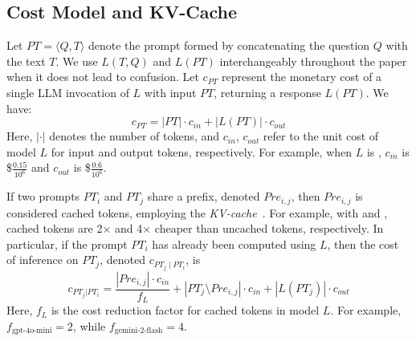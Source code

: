 \subsection{Cost Model and KV-Cache} 
\label{subsec:cost-model}
Let $PT = \langle Q, T \rangle$ denote the prompt formed by concatenating the question $Q$ with the text $T$. We use $L(T, Q)$ and $L(PT)$ interchangeably throughout the paper when it does not lead to confusion. Let $c_{PT}$ represent the monetary cost of a single LLM invocation of $L$ with input $PT$, returning a response $L(PT)$. We have:
\begin{equation}
    c_{PT} = |PT|\cdot c_{in} + |L(PT)|\cdot c_{out}
\end{equation}
\noindent Here, $|\cdot|$ denotes the number of tokens, and $c_{in}$, $c_{out}$ refer to the unit cost of model $L$ for input and output tokens, respectively. For example, when $L$ is , $c_{in}$ is \$$\frac{0.15}{10^6}$ and $c_{out}$ is \$$\frac{0.6}{10^6}$. 


If two prompts $PT_i$ and $PT_j$ share a prefix, denoted $Pre_{i,j}$, then $Pre_{i,j}$  is considered cached tokens, employing the {\em KV-cache}~\cite{cai2024pyramidkv,liu2024minicache,adnan2024keyformer}. For example, with  and , cached tokens are 2$\times$ and 4$\times$ cheaper than uncached tokens, respectively.
In particular, if the prompt $PT_i$ has already been computed using $L$, then the cost of  inference on $PT_j$, denoted $c_{PT_j \mid PT_i}$, is
\begin{equation}
    c_{PT_j | PT_i} = \frac{|Pre_{i,j}|\cdot c_{in}}{f_L} + |PT_j \setminus Pre_{i,j}|\cdot c_{in} + |L(PT_j)|\cdot c_{out}
\end{equation}
\noindent Here, $f_L$ is the cost reduction factor for cached tokens in model $L$. For example, $f_{\text{gpt-4o-mini}} = 2$, while $f_{\text{gemini-2-flash}} = 4$. 



\begin{table}[bt]
\scriptsize
\centering
{}
\caption{\small Percentage of Strongly-Monotonic (SM) and Weakly-Monotonic (WM) Tasks, with per‑row averages.}
\label{tab:tasks}
\vspace{-4em}
\end{table}

